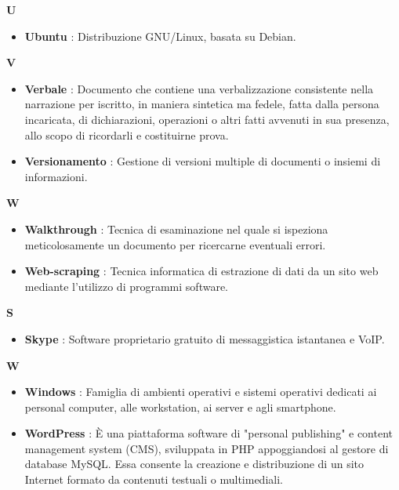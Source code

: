 \newpage
{\huge \textbf{U}}
\begin{flushleft}
\begin{itemize}[label={}]
\item \textbf{Ubuntu} : Distribuzione GNU/Linux, basata su Debian.
\end{itemize}
\end{flushleft}
\newpage
{\huge \textbf{V}}
\begin{flushleft}
\begin{itemize}[label={}]
\item \textbf{Verbale} : Documento che contiene una verbalizzazione consistente nella narrazione per iscritto, in maniera sintetica ma fedele, fatta dalla persona incaricata, di dichiarazioni, operazioni o altri fatti avvenuti in sua presenza, allo scopo di ricordarli e costituirne prova.
\item \textbf{Versionamento} : Gestione di versioni multiple di documenti o insiemi di informazioni.
\end{itemize}
\end{flushleft}
\newpage
{\huge \textbf{W}}
\begin{flushleft}
\begin{itemize}[label={}]
\item \textbf{Walkthrough} : Tecnica di esaminazione nel quale si ispeziona meticolosamente un documento per ricercarne eventuali errori.
\item \textbf{Web-scraping} : Tecnica informatica di estrazione di dati da un sito web mediante l'utilizzo di programmi software.
\end{itemize}
\end{flushleft}
\newpage
{\huge \textbf{S}}
\begin{flushleft}
\begin{itemize}[label={}]
\item \textbf{Skype} : Software proprietario gratuito di messaggistica istantanea e VoIP.
\end{itemize}
\end{flushleft}
\newpage
{\huge \textbf{W}}
\begin{flushleft}
\begin{itemize}[label={}]
\item \textbf{Windows} : Famiglia di ambienti operativi e sistemi operativi dedicati ai personal computer, alle workstation, ai server e agli smartphone.
\item \textbf{WordPress} : È una piattaforma software di "personal publishing" e content management system (CMS), sviluppata in PHP appoggiandosi al gestore di database MySQL. Essa consente la creazione e distribuzione di un sito Internet formato da contenuti testuali o multimediali.
\end{itemize}
\end{flushleft}
\newpage
